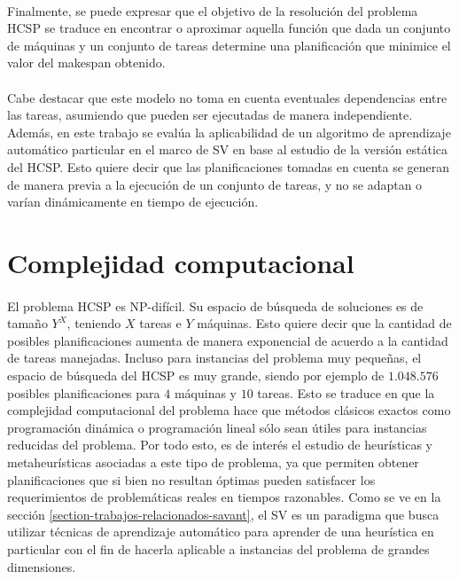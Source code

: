 \paragraph{}Finalmente, se puede expresar que el objetivo de la resolución del problema HCSP se traduce en encontrar o aproximar aquella función que dada un conjunto de máquinas y un conjunto de tareas determine una planificación que minimice el valor del makespan obtenido.

\paragraph{}Cabe destacar que este modelo no toma en cuenta eventuales dependencias entre las tareas, asumiendo que pueden ser ejecutadas de manera independiente. Además, en este trabajo se evalúa la aplicabilidad de un algoritmo de aprendizaje automático particular en el marco de SV en base al estudio de la versión estática del HCSP. Esto quiere decir que las planificaciones tomadas en cuenta se generan de manera previa a la ejecución de un conjunto de tareas, y no se adaptan o varían dinámicamente en tiempo de ejecución.

\section{Complejidad computacional} \label{section:descripcion-problema,subsection:complejidad-computacional}

\paragraph{}El problema HCSP es NP-difícil. Su espacio de búsqueda de soluciones es de tamaño $Y^X$, teniendo $X$ tareas e $Y$ máquinas. Esto quiere decir que la cantidad de posibles planificaciones aumenta de manera exponencial de acuerdo a la cantidad de tareas manejadas. Incluso para instancias del problema muy pequeñas, el espacio de búsqueda del HCSP es muy grande, siendo por ejemplo de $1.048.576$ posibles planificaciones para $4$ máquinas y $10$ tareas. Esto se traduce en que la complejidad computacional del problema hace que métodos clásicos exactos como programación dinámica o programación lineal sólo sean útiles para instancias reducidas del problema. Por todo esto, es de interés el estudio de heurísticas y metaheurísticas asociadas a este tipo de problema, ya que permiten obtener planificaciones que si bien no resultan óptimas pueden satisfacer los requerimientos de problemáticas reales en tiempos razonables.
Como se ve en la sección \ref{section-trabajos-relacionados-savant}, el SV es un paradigma que busca utilizar técnicas de aprendizaje automático para aprender de una heurística en particular con el fin de hacerla aplicable a instancias del problema de grandes dimensiones.


